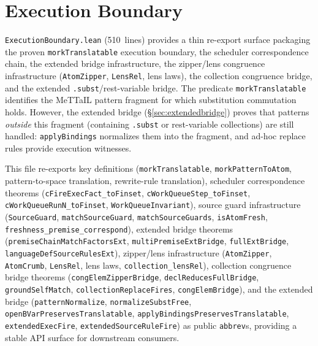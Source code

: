 \documentclass[11pt]{article}
\theoremstyle{definition}
\theoremstyle{remark}
\newcommand{\MeTTaIL}{\textup{MeTTaIL}}
\begin{document}
\section{Execution Boundary}
\label{sec:execboundary}

\texttt{ExecutionBoundary.lean} (510~lines) provides a thin re-export
surface packaging the proven \texttt{morkTranslatable} execution boundary,
the scheduler correspondence chain, the extended bridge infrastructure,
the zipper/lens congruence infrastructure (\texttt{AtomZipper},
\texttt{LensRel}, lens laws), the collection congruence bridge, and
the extended \texttt{.subst}/rest-variable bridge.
The predicate \texttt{morkTranslatable} identifies the \MeTTaIL{} pattern
fragment for which substitution commutation holds.  However, the
extended bridge (\S\ref{sec:extendedbridge}) proves that patterns
\emph{outside} this fragment (containing \texttt{.subst} or rest-variable
collections) are still handled: \texttt{applyBindings} normalizes them
into the fragment, and ad-hoc replace rules provide execution witnesses.

This file re-exports key definitions (\texttt{morkTranslatable},
\texttt{morkPatternToAtom}, pattern-to-space translation, rewrite-rule
translation), scheduler correspondence theorems
(\texttt{cFireExecFact\_toFinset}, \texttt{cWorkQueueStep\_toFinset},
\texttt{cWorkQueueRunN\_toFinset}, \texttt{WorkQueueInvariant}),
source guard infrastructure (\texttt{SourceGuard}, \texttt{matchSourceGuard},
\texttt{matchSourceGuards}, \texttt{isAtomFresh},
\texttt{freshness\_premise\_correspond}),
extended bridge theorems (\texttt{premiseChain\-MatchFactorsExt},
\texttt{multiPremiseExtBridge}, \texttt{fullExtBridge},
\texttt{languageDefSourceRulesExt}),
zipper/lens infrastructure (\texttt{AtomZipper}, \texttt{AtomCrumb},
\texttt{LensRel}, lens laws, \texttt{collection\_lensRel}),
collection congruence bridge theorems
(\texttt{congElemZipperBridge}, \texttt{declReducesFullBridge},
\texttt{groundSelfMatch}, \texttt{collectionReplaceFires},
\texttt{congElemBridge}),
and the extended bridge (\texttt{patternNormalize},
\texttt{normalizeSubstFree},
\texttt{openBVarPreservesTranslatable},
\texttt{applyBindingsPreservesTranslatable},
\texttt{extendedExecFire},
\texttt{extendedSourceRuleFire})
as public \texttt{abbrev}s, providing a stable API surface
for downstream consumers.

\end{document}
